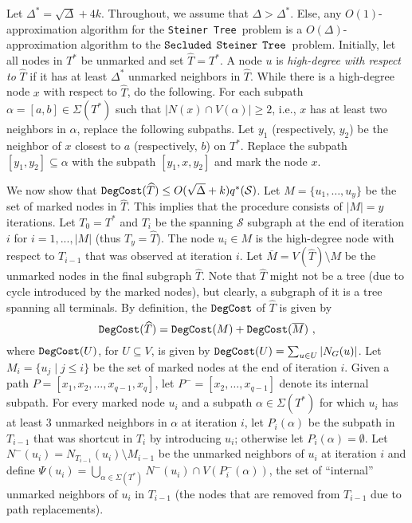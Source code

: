 \documentclass[12pt]{article}
\newcommand{\MAXDEG}[0]{\Delta}
\newcommand{\PS}[0]{$\mbox{\tt Secluded}$ $\mbox{\tt Steiner}$
$\mbox{\tt Tree}$}
\newcommand{\Terminals}[0]{\mathcal{S}}
\newcommand{\Steiner}[0]{\mbox{\tt Steiner Tree}}
\def\DegCost{\mbox{\tt DegCost}}
\def\HighDeg{\MAXDEG^{*}}
\begin{document}
Let $\HighDeg=\sqrt{\MAXDEG}+4k$. Throughout, we assume that $\MAXDEG> \HighDeg$. Else, any $O(1)$-approximation algorithm for the \Steiner\ problem is a $O(\MAXDEG)$-approximation algorithm to the \PS\ problem.
Initially, let all nodes in $T^{*}$ be unmarked and set $\widehat{T}=T^{*}$.
A node $u$ is \emph{high-degree with respect to} $\widehat{T}$ if it has at least $\HighDeg$ unmarked neighbors in $\widehat{T}$. While there is a high-degree node $x$ with respect to $\widehat{T}$, do the following. For each subpath $\alpha=[a,b] \in \Sigma(T^{*})$ such that $|N(x) \cap V(\alpha)|\geq 2$, i.e., $x$ has at least two neighbors in $\alpha$, replace the following subpaths. Let $y_1$ (respectively, $y_2$) be the neighbor of $x$ closest to $a$ (respectively, $b$) on $T^{*}$. Replace the subpath $[y_1,y_2] \subseteq \alpha$ with the subpath $[y_1,x,y_2]$ and mark the node $x$.

We now show that $\DegCost(\widehat{T}) \leq O(\sqrt{\MAXDEG}+k)q^{*}(\Terminals)$. Let $M=\{u_1, \ldots, u_y\}$ be the set of marked nodes in $\widehat{T}$. This implies that the procedure consists of $|M|=y$ iterations. Let $T_0=T^{*}$ and $T_i$ be the spanning $\Terminals$ subgraph at the end of iteration $i$ for $i=1, ..., |M|$ (thus $T_{y}=\widehat{T}$). The node $u_i \in M$ is the high-degree node with respect to $T_{i-1}$ that was observed at iteration $i$. Let $\overline{M}=V(\widehat{T}) \setminus M$ be the unmarked nodes in the final subgraph $\widehat{T}$. Note that $\widehat{T}$ might not be a tree (due to cycle introduced by the marked nodes), but clearly, a subgraph of it is a  tree spanning all terminals. By definition, the $\DegCost$ of $\widehat{T}$ is given by
\begin{equation}
\label{eq:degcost_t}
\DegCost(\widehat{T}) =\DegCost(M)+\DegCost(\overline{M})~,
\end{equation}
where $\DegCost(U)$, for $U \subseteq V$, is given by $\DegCost(U)=\sum_{u \in U}|N_G(u)|$. Let $M_i=\{u_j \mid j\leq i\}$ be the set of marked nodes at the end of iteration $i$. Given a path $P=[x_1, x_2, \ldots, x_{q-1}, x_q]$, let $P^{-}=[x_2, \ldots, x_{q-1}]$ denote its internal subpath. For every marked node $u_i$ and a subpath $\alpha \in \Sigma(T^{*})$ for which $u_i$ has at least $3$ unmarked neighbors in $\alpha$ at iteration $i$, let $P_i(\alpha)$ be the subpath in $T_{i-1}$ that was shortcut in $T_i$ by introducing $u_i$; otherwise let $P_i(\alpha)=\emptyset$.
Let $N^{-}(u_i)=N_{T_{i-1}}(u_i) \setminus M_{i-1}$ be the unmarked neighbors of $u_i$ at iteration $i$ and define
$\Psi(u_i)=\bigcup_{\alpha \in \Sigma(T^{*})}N^{-}(u_i) \cap V(P_i^{-}(\alpha))$, the set of ``internal'' unmarked neighbors of $u_i$ in $T_{i-1}$ (the nodes that are removed from $T_{i-1}$ due to path replacements).
\end{document}
